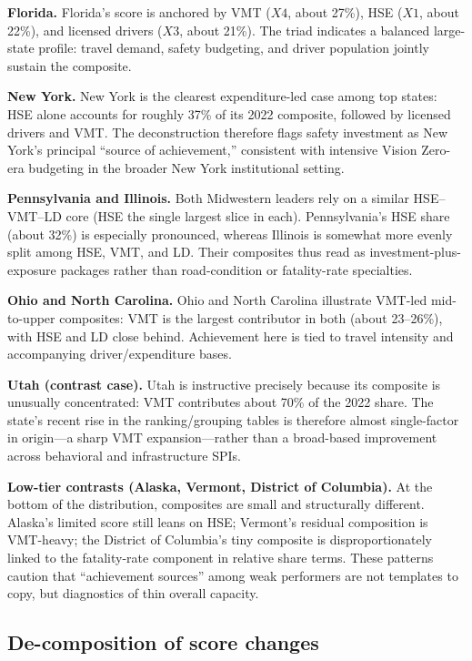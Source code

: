 \documentclass{article}
\begin{document}
\textbf{Florida.} Florida's score is anchored by VMT ($X4$, about 27\%), HSE ($X1$, about 22\%), and licensed drivers ($X3$, about 21\%). The triad indicates a balanced large-state profile: travel demand, safety budgeting, and driver population jointly sustain the composite.

\textbf{New York.} New York is the clearest expenditure-led case among top states: HSE alone accounts for roughly 37\% of its 2022 composite, followed by licensed drivers and VMT. The deconstruction therefore flags safety investment as New York's principal ``source of achievement,'' consistent with intensive Vision Zero-era budgeting in the broader New York institutional setting.

\textbf{Pennsylvania and Illinois.} Both Midwestern leaders rely on a similar HSE--VMT--LD core (HSE the single largest slice in each). Pennsylvania's HSE share (about 32\%) is especially pronounced, whereas Illinois is somewhat more evenly split among HSE, VMT, and LD. Their composites thus read as investment-plus-exposure packages rather than road-condition or fatality-rate specialties.

\textbf{Ohio and North Carolina.} Ohio and North Carolina illustrate VMT-led mid-to-upper composites: VMT is the largest contributor in both (about 23--26\%), with HSE and LD close behind. Achievement here is tied to travel intensity and accompanying driver/expenditure bases.

\textbf{Utah (contrast case).} Utah is instructive precisely because its composite is unusually concentrated: VMT contributes about 70\% of the 2022 share. The state's recent rise in the ranking/grouping tables is therefore almost single-factor in origin---a sharp VMT expansion---rather than a broad-based improvement across behavioral and infrastructure SPIs.

\textbf{Low-tier contrasts (Alaska, Vermont, District of Columbia).} At the bottom of the distribution, composites are small and structurally different. Alaska's limited score still leans on HSE; Vermont's residual composition is VMT-heavy; the District of Columbia's tiny composite is disproportionately linked to the fatality-rate component in relative share terms. These patterns caution that ``achievement sources'' among weak performers are not templates to copy, but diagnostics of thin overall capacity.


\subsection{De-composition of score changes}
\end{document}
